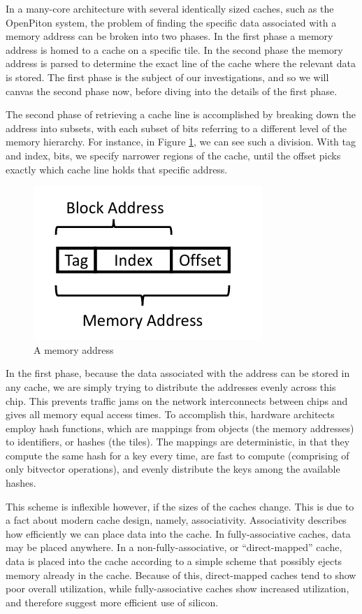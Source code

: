 In a many-core architecture with several identically sized caches, such as the
OpenPiton system, the problem of finding the specific data associated with a
memory address can be broken into two phases.  In the first phase a memory
address is homed to a cache on a specific tile.  In the second phase the memory
address is parsed to determine the exact line of the cache where the relevant
data is stored.  The first phase is the subject of our investigations, and so we
will canvas the second phase now, before diving into the details of the first
phase.

The second phase of retrieving a cache line is accomplished by breaking down the
address into subsets, with each subset of bits referring to a different level of
the memory hierarchy.  For instance, in Figure \ref{Fig:memory_addr}, we can see
such a division.  With tag and index, bits, we specify narrower regions of the
cache, until the offset picks exactly which cache line holds that specific
address.

\begin{figure}[h]
  \centering
  \includegraphics[scale=0.4]{figures/memory_addr.png}
  \caption{A memory address}
  \label{Fig:memory_addr}
\end{figure}

In the first phase, because the data associated with the address can be stored
in any cache, we are simply trying to distribute the addresses evenly across
this chip.  This prevents traffic jams on the network interconnects between
chips and gives all memory equal access times.  To accomplish this, hardware
architects employ hash functions, which are mappings from objects (the memory
addresses) to identifiers, or hashes (the tiles).  The mappings are
deterministic, in that they compute the same hash for a key every time, are fast
to compute (comprising of only bitvector operations), and evenly distribute the
keys among the available hashes.

This scheme is inflexible however, if the sizes of the caches change.  This is
due to a fact about modern cache design, namely, associativity.  Associativity
describes how efficiently we can place data into the cache.  In
fully-associative caches, data may be placed anywhere.  In a
non-fully-associative, or ``direct-mapped'' cache, data is placed into the cache
according to a simple scheme that possibly ejects memory already in the cache.
Because of this, direct-mapped caches tend to show poor overall utilization,
while fully-associative caches show increased utilization, and therefore suggest
more efficient use of silicon.

